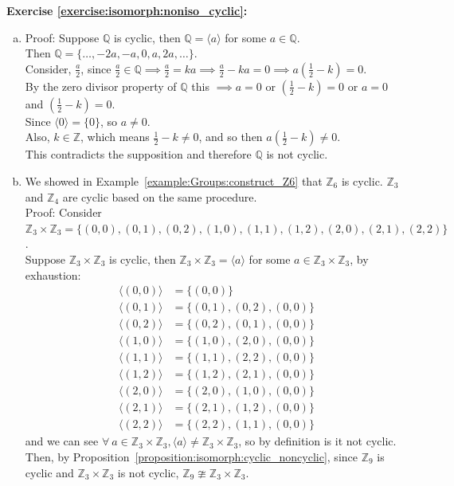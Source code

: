 \noindent\textbf{Exercise \ref{exercise:isomorph:noniso_cyclic}:}
\begin{enumerate}[(a)]
\item
Proof: Suppose ${\mathbb Q}$ is cyclic, then ${\mathbb Q} = \langle a \rangle$ for some $a \in {\mathbb Q}$.
\\
Then ${\mathbb Q} = \{ \dotsc , -2a, -a, 0, a, 2a, \dotsc\}$.
\\
Consider, $\frac{a}{2}$, since $\frac{a}{2} \in {\mathbb Q} \implies \frac{a}{2} = ka \implies \frac{a}{2} - ka = 0 \implies a(\frac{1}{2} - k) = 0$.
\\
By the zero divisor property of ${\mathbb Q}$ this $\implies a = 0$ or $(\frac{1}{2} - k) = 0$ or $a = 0$ and $(\frac{1}{2} - k) = 0$.
\\
Since $\langle 0 \rangle = \{0\}$, so $a \neq 0$.
\\
Also, $k \in {\mathbb Z}$, which means $\frac{1}{2} - k \neq 0$, and so then $a(\frac{1}{2} - k) \neq 0$.
\\
This contradicts the supposition and therefore ${\mathbb Q}$ is not cyclic.

\item
We showed in Example~\ref{example:Groups:construct_Z6} that ${\mathbb Z}_6$ is cyclic.  ${\mathbb Z}_3$ and ${\mathbb Z}_4$ are cyclic based on the same procedure.
\\
Proof: Consider ${\mathbb Z}_3 \times {\mathbb Z}_3 = \{(0, 0), (0, 1), (0, 2), (1, 0), (1, 1), (1, 2), (2, 0), (2, 1), (2,2)\}$.
\\
Suppose  ${\mathbb Z}_3 \times {\mathbb Z}_3$ is cyclic, then ${\mathbb Z}_3 \times {\mathbb Z}_3 = \langle a \rangle$ for some $a \in {\mathbb Z}_3 \times {\mathbb Z}_3$, by exhaustion:
\begin{align*}
\langle(0, 0)\rangle &= \{(0, 0)\}
\\
\langle(0, 1)\rangle &= \{(0, 1), (0, 2), (0, 0)\}
\\
\langle(0, 2)\rangle &= \{(0, 2), (0, 1), (0, 0)\}
\\
\langle(1, 0)\rangle &= \{(1, 0), (2, 0), (0, 0)\}
\\
\langle(1, 1)\rangle &= \{(1, 1), (2,2), (0, 0)\}
\\
\langle(1, 2)\rangle &= \{(1, 2), (2, 1), (0, 0)\}
\\
\langle(2, 0)\rangle &= \{(2, 0), (1, 0), (0, 0)\}
\\
\langle(2, 1)\rangle &= \{(2, 1), (1, 2), (0, 0)\}
\\
\langle(2, 2)\rangle &= \{(2, 2), (1, 1), (0, 0)\}
\end{align*}
and we can see $\forall\ a \in {\mathbb Z}_3 \times {\mathbb Z}_3, \langle a \rangle \neq {\mathbb Z}_3 \times {\mathbb Z}_3$, so by definition is it not cyclic.
\\
Then, by Proposition~\ref{proposition:isomorph:cyclic_noncyclic}, since ${\mathbb Z}_9$ is cyclic and ${\mathbb Z}_3 \times {\mathbb Z}_3$ is not cyclic, ${\mathbb Z}_9 \ncong {\mathbb Z}_3 \times {\mathbb Z}_3$.


\end{enumerate}
